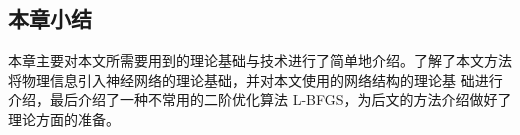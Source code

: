 \documentclass{Sichuan Normal University}
\begin{document}
\subsection{本章小结}
本章主要对本文所需要用到的理论基础与技术进行了简单地介绍。了解了本文方法将物理信息引入神经网络的理论基础，并对本文使用的网络结构的理论基
础进行介绍，最后介绍了一种不常用的二阶优化算法 L-BFGS，为后文的方法介绍做好了理论方面的准备。






    
    
    
    
    
    
    
    
\end{document}
